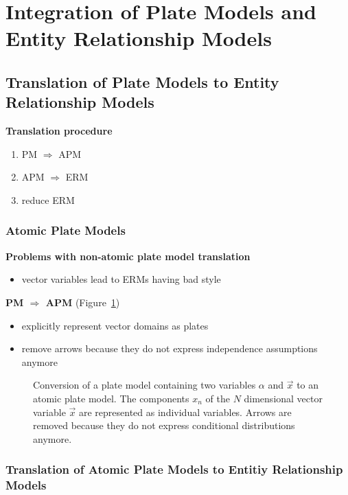 \section{Integration of Plate Models and Entity Relationship Models}

\subsection{Translation of Plate Models to Entity Relationship Models}

\textbf{Translation procedure}
\begin{enumerate}
\item PM $\Rightarrow$ APM
\item APM $\Rightarrow$ ERM
\item reduce ERM
\end{enumerate}

\subsubsection{Atomic Plate Models}

\textbf{Problems with non-atomic plate model translation}
\begin{itemize}
\item vector variables lead to ERMs having bad style
\end{itemize}

\textbf{PM $\Rightarrow$ APM} (Figure~\ref{fig:pm2apm})
\begin{itemize}
\item explicitly represent vector domains as plates
\item remove arrows because they do not express independence assumptions anymore
\end{itemize}

\begin{figure}
\centering
\resizebox{.9\linewidth}{!}{\adjustTikzSize }
\caption{Conversion of a plate model containing two variables $\alpha$ and $\vec x$ to an atomic plate model. The components $x_n$ of the $N$ dimensional vector variable $\vec x$ are represented as individual variables. Arrows are removed because they do not express conditional distributions anymore.}\label{fig:pm2apm}
\end{figure}

\subsubsection{Translation of Atomic Plate Models to Entitiy Relationship Models}

